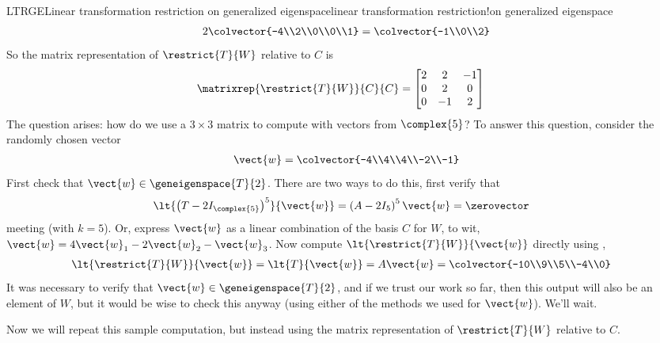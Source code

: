 \begin{example}{LTRGE}{Linear transformation restriction on generalized eigenspace}{linear transformation restriction!on generalized eigenspace}
\begin{align*}
{2\colvector{-4\\2\\0\\0\\1}
}
=\colvector{-1\\0\\2}\\
%
\end{align*}
%
So the matrix representation of $\restrict{T}{W}$ relative to $C$ is
%
\begin{align*}
\matrixrep{\restrict{T}{W}}{C}{C}&=
\begin{bmatrix}
2 & 2 & -1\\
0 & 2 & 0\\
0 & -1 & 2
\end{bmatrix}
\end{align*}
%
The question arises:  how do we use a $3\times 3$ matrix to compute with vectors from $\complex{5}$?  To answer this question, consider the randomly chosen vector
%
\begin{align*}
\vect{w}=\colvector{-4\\4\\4\\-2\\-1}
\end{align*}
%
First check that $\vect{w}\in\geneigenspace{T}{2}$.  There are two ways to do this, first verify that
%
\begin{align*}
\lt{\left(T-2I_{\complex{5}}\right)^5}{\vect{w}}
&=\left(A-2I_5\right)^5\vect{w}=\zerovector
\end{align*}
%
meeting  (with $k=5$).  Or, express $\vect{w}$ as a linear combination of the basis $C$ for $W$, to wit, $\vect{w}=4\vect{w}_1-2\vect{w}_2-\vect{w}_3$.  Now compute $\lt{\restrict{T}{W}}{\vect{w}}$ directly using ,
%
\begin{align*}
\lt{\restrict{T}{W}}{\vect{w}}
&=\lt{T}{\vect{w}}
=A\vect{w}
=\colvector{-10\\9\\5\\-4\\0}
\end{align*}
%
It was necessary to verify that $\vect{w}\in\geneigenspace{T}{2}$, and if we trust our work so far, then this output will also be an element of $W$, but it would be wise to check this anyway (using either of the methods we used for $\vect{w}$).  We'll wait.\par
%
Now we will repeat this sample computation, but instead using the matrix representation of $\restrict{T}{W}$ relative to $C$.

\end{example}
